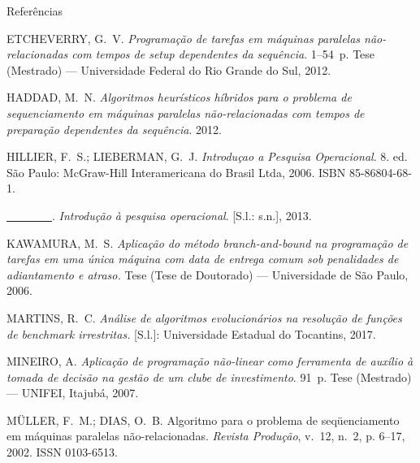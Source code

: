 \documentclass[]{beamer}
\begin{document}
\begin{frame}[allowframebreaks]{Referências}
\begin{thebibliography}{9}
		{ETCHEVERRY, G.~V.
		\emph{{Programa{\c{c}}{\~{a}}o de tarefas em m{\'{a}}quinas paralelas
		  n{\~{a}}o-relacionadas com tempos de setup dependentes da sequ{\^{e}}ncia}}.
		1--54~p. Tese (Mestrado) --- Universidade Federal do Rio Grande do Sul, 2012.}
		
		{HADDAD, M.~N. \emph{{Algoritmos heur{\'{i}}sticos h{\'{i}}bridos para o
		  problema de sequenciamento em m{\'{a}}quinas paralelas n{\~{a}}o-relacionadas
		  com tempos de prepara{\c{c}}{\~{a}}o dependentes da sequ{\^{e}}ncia}}. 2012.}
		
		{HILLIER, F.~S.; LIEBERMAN, G.~J. \emph{{Introdu{\c{c}}ao a Pesquisa
		  Operacional}}. 8. ed. S{\~{a}}o Paulo: McGraw-Hill Interamericana do Brasil
		  Ltda, 2006.
		ISBN 85-86804-68-1.}
		
		{\underline{\ \ \ \ \ \ \ \ }. \emph{{Introdu{\c{c}}{\~{a}}o {\`{a}} pesquisa
		  operacional}}. [S.l.: s.n.], 2013.}
		
		{KAWAMURA, M.~S.
		\emph{{Aplica{\c{c}}{\~{a}}o do m{\'{e}}todo branch-and-bound na
		  programa{\c{c}}{\~{a}}o de tarefas em uma {\'{u}}nica m{\'{a}}quina com data
		  de entrega comum sob penalidades de adiantamento e atraso.}}
		Tese (Tese de Doutorado) --- Universidade de S{\~{a}}o Paulo, 2006.}
		
		{MARTINS, R.~C. \emph{{An{\'{a}}lise de algoritmos evolucion{\'{a}}rios na
		  resolu{\c{c}}{\~{a}}o de fun{\c{c}}{\~{o}}es de benchmark irrestritas.}}
		  [S.l.]: Universidade Estadual do Tocantins, 2017.}
		
		{MINEIRO, A.
		\emph{{Aplica{\c{c}}{\~{a}}o de programa{\c{c}}{\~{a}}o n{\~{a}}o-linear como
		  ferramenta de aux{\'{i}}lio {\`{a}} tomada de decis{\~{a}}o na gest{\~{a}}o
		  de um clube de investimento}}.
		91~p. Tese (Mestrado) --- UNIFEI, Itajub{\'{a}}, 2007.}
		
		{M{\"{U}}LLER, F.~M.; DIAS, O.~B. {Algoritmo para o problema de
		  seq{\"{u}}enciamento em m{\'{a}}quinas paralelas n{\~{a}}o-relacionadas}.
		\emph{Revista Produ{\c{c}}{\~{a}}o}, v.~12, n.~2, p. 6--17, 2002.
		ISSN 0103-6513.}
		

\end{thebibliography}
\end{frame}
\end{document}
